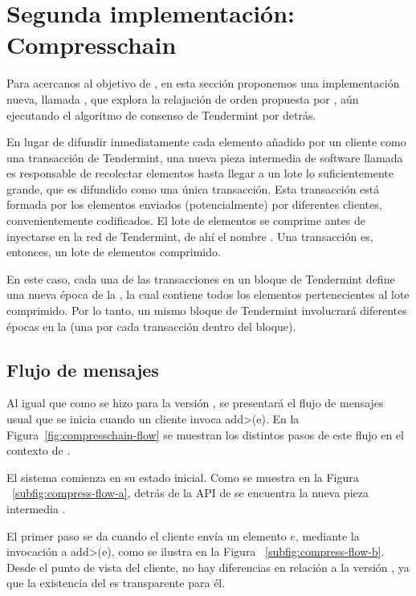 \section{Segunda implementación: Compresschain}\label{sec:compresschain}

Para acercanos al objetivo de \setchain, en esta sección proponemos
%
una implementación nueva, llamada \compresschain, que explora
la relajación de orden propuesta por \setchain, aún ejecutando el algoritmo de
consenso de Tendermint por detrás.
%

En lugar de difundir inmediatamente cada elemento añadido por un cliente como una
transacción de Tendermint, una nueva pieza intermedia de software llamada \collector
es responsable de recolectar elementos hasta llegar a un lote lo suficientemente grande,
que es difundido como una única transacción.
%
Esta transacción está formada por los elementos
enviados (potencialmente) por diferentes clientes, convenientemente codificados.
%
El lote de elementos se comprime antes de inyectarse en la red de Tendermint, de ahí el nombre
\compresschain.
%
Una transacción es, entonces, un lote de elementos comprimido.

En este caso, cada una de las transacciones en un bloque de Tendermint define una
nueva época de la \setchain, la cual contiene todos los elementos pertenecientes al lote
comprimido.
Por lo tanto, un mismo bloque de Tendermint involucrará diferentes épocas en la \setchain
(una por cada transacción dentro del bloque).

\subsection{Flujo de mensajes}
Al igual que como se hizo para la versión \vanilla, se presentará el flujo de mensajes usual
que se inicia cuando un cliente invoca \<add>(e).
En la Figura~\ref{fig:compresschain-flow} se muestran los distintos pasos de
este flujo en el contexto de \compresschain.
%

El sistema comienza en su estado inicial.
Como se muestra en la Figura ~\ref{subfig:compress-flow-a}, detrás de la API de \setchain
se encuentra la nueva pieza intermedia \collector.

%

El primer paso se da cuando el cliente envía un elemento $e$, mediante la invocación a \<add>(e), como se
ilustra en la Figura ~\ref{subfig:compress-flow-b}.
Desde el punto de vista del cliente, no hay diferencias en relación a la versión \vanilla, ya que
la existencia del \collector es transparente para él.

